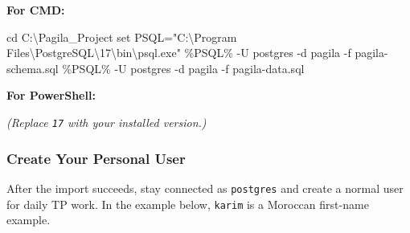 \documentclass[
  letterpaper,
  DIV=11,
  numbers=noendperiod]{scrartcl}
\newenvironment{Shaded}{\begin{snugshade}}{\end{snugshade}}
\newcommand{\AttributeTok}[1]{\textcolor[rgb]{0.40,0.45,0.13}{#1}}
\newcommand{\BuiltInTok}[1]{\textcolor[rgb]{0.00,0.23,0.31}{#1}}
\newcommand{\FunctionTok}[1]{\textcolor[rgb]{0.28,0.35,0.67}{#1}}
\newcommand{\NormalTok}[1]{\textcolor[rgb]{0.00,0.23,0.31}{#1}}
\newcommand{\OperatorTok}[1]{\textcolor[rgb]{0.37,0.37,0.37}{#1}}
\newcommand{\PreprocessorTok}[1]{\textcolor[rgb]{0.68,0.00,0.00}{#1}}
\newcommand{\StringTok}[1]{\textcolor[rgb]{0.13,0.47,0.30}{#1}}
\newcommand{\VariableTok}[1]{\textcolor[rgb]{0.07,0.07,0.07}{#1}}
\begin{document}
\textbf{For CMD:}

\begin{Shaded}
\begin{Highlighting}[]
\BuiltInTok{cd}\NormalTok{ C:\textbackslash{}Pagila\_Project}
\BuiltInTok{set} \VariableTok{PSQL}\NormalTok{=}\StringTok{"C:\textbackslash{}Program Files\textbackslash{}PostgreSQL\textbackslash{}17\textbackslash{}bin\textbackslash{}psql.exe"}
\PreprocessorTok{\%}\VariableTok{PSQL}\PreprocessorTok{\%}\NormalTok{ {-}U postgres }\AttributeTok{{-}d}\NormalTok{ pagila }\AttributeTok{{-}f}\NormalTok{ pagila}\AttributeTok{{-}schema}\NormalTok{.sql}
\PreprocessorTok{\%}\VariableTok{PSQL}\PreprocessorTok{\%}\NormalTok{ {-}U postgres }\AttributeTok{{-}d}\NormalTok{ pagila }\AttributeTok{{-}f}\NormalTok{ pagila}\AttributeTok{{-}data}\NormalTok{.sql}
\end{Highlighting}
\end{Shaded}

\textbf{For PowerShell:}

\begin{Shaded}
\end{Shaded}

\emph{(Replace \texttt{17} with your installed version.)}

\subsubsection{Create Your Personal
User}\label{create-your-personal-user}

After the import succeeds, stay connected as \texttt{postgres} and
create a normal user for daily TP work. In the example below,
\texttt{karim} is a Moroccan first-name example.
\end{document}
